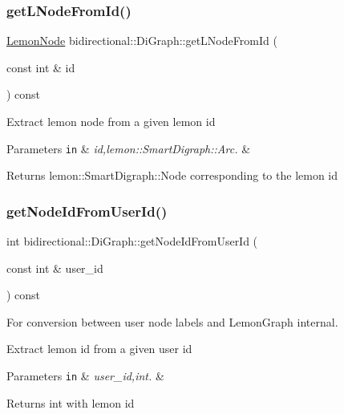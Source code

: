 \subsubsection{\texorpdfstring{get\+L\+Node\+From\+Id()}{getLNodeFromId()}}
{\footnotesize\ttfamily \hyperlink{digraph_8h_a9e28ff6f29770c88642a42cab9f42fed}{Lemon\+Node} bidirectional\+::\+Di\+Graph\+::get\+L\+Node\+From\+Id (\begin{DoxyParamCaption}\item[{const int \&}]{id }\end{DoxyParamCaption}) const\hspace{0.3cm}{\ttfamily [inline]}}

Extract lemon node from a given lemon id


\begin{DoxyParams}[1]{Parameters}
\mbox{\tt in}  & {\em id,lemon\+::\+Smart\+Digraph\+::\+Arc.} & \\
\hline
\end{DoxyParams}
\begin{DoxyReturn}{Returns}
lemon\+::\+Smart\+Digraph\+::\+Node corresponding to the lemon id 
\end{DoxyReturn}
\mbox{\label{classbidirectional_1_1DiGraph_a9b6d435d6eac3751da5b2ee427826657}} 
\subsubsection{\texorpdfstring{get\+Node\+Id\+From\+User\+Id()}{getNodeIdFromUserId()}}
{\footnotesize\ttfamily int bidirectional\+::\+Di\+Graph\+::get\+Node\+Id\+From\+User\+Id (\begin{DoxyParamCaption}\item[{const int \&}]{user\+\_\+id }\end{DoxyParamCaption}) const}



For conversion between user node labels and Lemon\+Graph internal. 

Extract lemon id from a given user id


\begin{DoxyParams}[1]{Parameters}
\mbox{\tt in}  & {\em user\+\_\+id,int.} & \\
\hline
\end{DoxyParams}
\begin{DoxyReturn}{Returns}
int with lemon id 
\end{DoxyReturn}
\mbox{\label{classbidirectional_1_1DiGraph_a45a3d6b4164c0881cdad5ab23aa9eda8}} 
